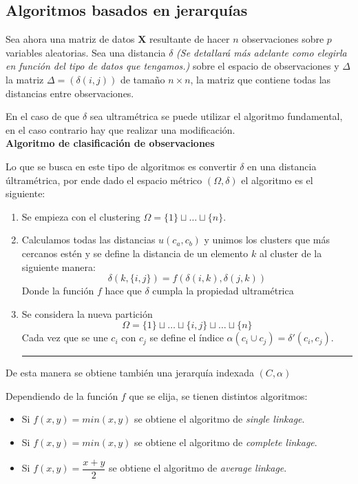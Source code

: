 \newpage
\subsection{Algoritmos basados en jerarquías}
\noindent Sea ahora una matriz de datos $\textbf{X}$ resultante de hacer $n$ observaciones sobre $p$ variables aleatorias. Sea una distancia $\delta$ \textit{(Se detallará más adelante como elegirla en función del tipo de datos que tengamos.)} sobre el espacio de observaciones y $\Delta$ la matriz $\Delta=(\delta(i,j))$ de tamaño $n \times n$, la matriz que contiene todas las distancias entre observaciones. 

\noindent En el caso de que $\delta$ sea ultramétrica se puede utilizar el algoritmo fundamental, en el caso contrario hay que realizar una modificación. \\

\noindent \textbf{Algoritmo de clasificación de observaciones}

\noindent Lo que se busca en este tipo de algoritmos es convertir $\delta$ en una distancia últramétrica, por ende dado el espacio métrico $(\Omega, \delta)$ el algoritmo es el siguiente:\\
\begin{enumerate}
\hrule
\item Se empieza con el clustering $\Omega= \lbrace 1\rbrace \sqcup \ldots \sqcup\lbrace n \rbrace$. 
\item Calculamos todas las distancias $u(c_a,c_b)$ y unimos los clusters que más cercanos estén y se define la distancia de un elemento $k$ al cluster de la siguiente manera:
\begin{equation}
\delta(k,\lbrace i,j \rbrace)=f(\delta(i,k),\delta(j,k))
\end{equation}
Donde la función $f$ hace que $\delta$ cumpla la propiedad ultramétrica

\item Se considera la nueva partición
\begin{equation}
\Omega= \lbrace 1\rbrace \sqcup\ldots \sqcup \lbrace i,j\rbrace \sqcup \ldots \sqcup\lbrace n \rbrace
\end{equation}
Cada vez que se une $c_i$ con $c_j$ se define el índice $\alpha(c_i\cup c_j)=\delta'(c_i,c_j)$.\\
\hrule
\end{enumerate}
De esta manera se obtiene también una jerarquía indexada $(C,\alpha)$

\noindent Dependiendo de la función $f$ que se elija, se tienen distintos algoritmos:
\begin{itemize}
\item Si $f(x,y)=min(x,y)$ se obtiene el algoritmo de \textit{single linkage}.
\item  Si $f(x,y)=min(x,y)$ se obtiene el algoritmo de \textit{complete linkage}.
\item  Si $f(x,y)=\dfrac{x+y}{2}$ se obtiene el algoritmo de \textit{average linkage}.
\end{itemize}

